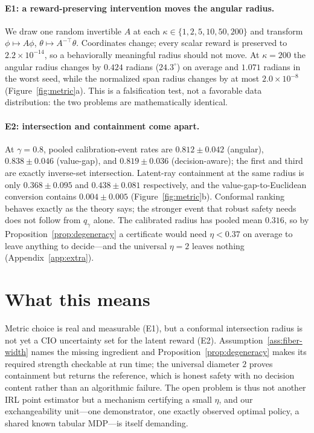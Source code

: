 \documentclass{article}
\begin{document}
\paragraph{E1: a reward-preserving intervention moves the angular radius.} We
draw one random invertible $A$ at each $\kappa\in\{1,2,5,10,50,200\}$ and
transform $\phi\mapsto A\phi$, $\theta\mapsto A^{-\top}\theta$. Coordinates
change; every scalar reward is preserved to $2.2\times10^{-14}$, so a
behaviorally meaningful radius should not move. At $\kappa=200$ the angular
radius changes by $0.424$ radians ($24.3^\circ$) on average and $1.071$ radians
in the worst seed, while the normalized span radius changes by at most
$2.0\times10^{-8}$ (Figure~\ref{fig:metric}a). This is a falsification test, not
a favorable data distribution: the two problems are mathematically identical.

\paragraph{E2: intersection and containment come apart.} At $\gamma=0.8$, pooled
calibration-event rates are $0.812\pm0.042$ (angular), $0.838\pm0.046$
(value-gap), and $0.819\pm0.036$ (decision-aware); the first and third are
exactly inverse-set intersection. Latent-ray containment at the same radius is
only $0.368\pm0.095$ and $0.438\pm0.081$ respectively, and the
value-gap-to-Euclidean conversion contains $0.004\pm0.005$
(Figure~\ref{fig:metric}b). Conformal ranking behaves exactly as the theory
says; the stronger event that robust safety needs does not follow from
$q_\gamma$ alone. The calibrated radius has pooled mean $0.316$, so by
Proposition~\ref{prop:degeneracy} a certificate would need $\eta<0.37$ on
average to leave anything to decide---and the universal $\eta=2$ leaves nothing
(Appendix~\ref{app:extra}).

\section{What this means}
\label{sec:discussion}

Metric choice is real and measurable (E1), but a conformal intersection radius
is not yet a CIO uncertainty set for the latent reward (E2).
Assumption~\ref{ass:fiber-width} names the missing ingredient and
Proposition~\ref{prop:degeneracy} makes its required strength checkable at run
time; the
universal diameter $2$ proves containment but returns the reference, which is
honest safety with no decision content rather than an algorithmic failure. The
open problem is thus not another IRL point estimator but a mechanism certifying
a small $\eta$, and our exchangeability unit---one demonstrator, one exactly
observed optimal policy, a shared known tabular MDP---is itself demanding.
\end{document}
